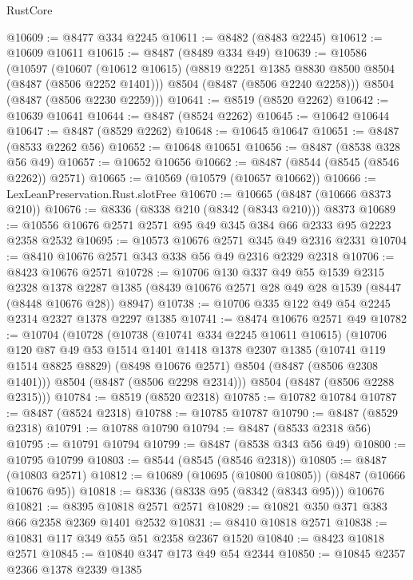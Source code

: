 \begin{lexlean}{RustCore}
\begin{coremodule}
@10609 := @8477 @334 @2245
@10611 := @8482 (@8483 @2245)
@10612 := @10609 @10611
@10615 := @8487 (@8489 @334 @49)
@10639 := @10586
    (@10597
      (@10607
        (@10612 @10615)
        (@8819 @2251 @1385 @8830 @8500 @8504 (@8487 (@8506 @2252 @1401)))
        @8504
        (@8487 (@8506 @2240 @2258)))
      @8504
      (@8487 (@8506 @2230 @2259)))
@10641 := @8519 (@8520 @2262)
@10642 := @10639 @10641
@10644 := @8487 (@8524 @2262)
@10645 := @10642 @10644
@10647 := @8487 (@8529 @2262)
@10648 := @10645 @10647
@10651 := @8487 (@8533 @2262 @56)
@10652 := @10648 @10651
@10656 := @8487 (@8538 @328 @56 @49)
@10657 := @10652 @10656
@10662 := @8487 (@8544 (@8545 (@8546 @2262)) @2571)
@10665 := @10569 (@10579 (@10657 @10662))
@10666 := LexLeanPreservation.Rust.slotFree
@10670 := @10665 (@8487 (@10666 @8373 @210))
@10676 := @8336 (@8338 @210 (@8342 (@8343 @210))) @8373
@10689 := @10556 @10676 @2571 @2571 @95 @49 @345 @384 @66 @2333 @95 @2223 @2358 @2532
@10695 := @10573 @10676 @2571 @345 @49 @2316 @2331
@10704 := @8410 @10676 @2571 @343 @338 @56 @49 @2316 @2329 @2318
@10706 := @8423 @10676 @2571
@10728 := @10706
    @130
    @337
    @49
    @55
    @1539
    @2315
    @2328
    @1378
    @2287
    @1385
    (@8439 @10676 @2571 @28 @49 @28 @1539 (@8447 (@8448 @10676 @28)) @8947)
@10738 := @10706 @335 @122 @49 @54 @2245 @2314 @2327 @1378 @2297 @1385
@10741 := @8474 @10676 @2571 @49
@10782 := @10704
    (@10728
      (@10738
        (@10741 @334 @2245 @10611 @10615)
        (@10706
          @120
          @87
          @49
          @53
          @1514
          @1401
          @1418
          @1378
          @2307
          @1385
          (@10741 @119 @1514 @8825 @8829)
          (@8498 @10676 @2571)
          @8504
          (@8487 (@8506 @2308 @1401)))
        @8504
        (@8487 (@8506 @2298 @2314)))
      @8504
      (@8487 (@8506 @2288 @2315)))
@10784 := @8519 (@8520 @2318)
@10785 := @10782 @10784
@10787 := @8487 (@8524 @2318)
@10788 := @10785 @10787
@10790 := @8487 (@8529 @2318)
@10791 := @10788 @10790
@10794 := @8487 (@8533 @2318 @56)
@10795 := @10791 @10794
@10799 := @8487 (@8538 @343 @56 @49)
@10800 := @10795 @10799
@10803 := @8544 (@8545 (@8546 @2318))
@10805 := @8487 (@10803 @2571)
@10812 := @10689 (@10695 (@10800 @10805)) (@8487 (@10666 @10676 @95))
@10818 := @8336 (@8338 @95 (@8342 (@8343 @95))) @10676
@10821 := @8395 @10818 @2571 @2571
@10829 := @10821 @350 @371 @383 @66 @2358 @2369 @1401 @2532
@10831 := @8410 @10818 @2571
@10838 := @10831 @117 @349 @55 @51 @2358 @2367 @1520
@10840 := @8423 @10818 @2571
@10845 := @10840 @347 @173 @49 @54 @2344
@10850 := @10845 @2357 @2366 @1378 @2339 @1385

\end{coremodule}
\end{lexlean}
